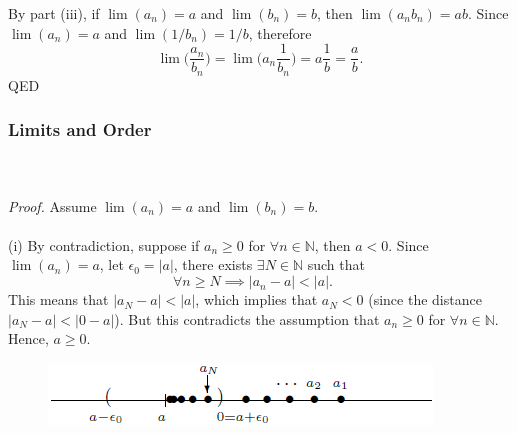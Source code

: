 \documentclass{article}
\begin{document}
                By part (iii), if $\lim(a_n)=a$ and $\lim (b_n)=b$, then $\lim (a_nb_n) = ab$. Since $\lim(a_n)=a$ and $\lim(1/b_n)=1/b$, therefore
                \begin{equation*}
                    \lim \bigg( \frac{a_n}{b_n} \bigg) = \lim \bigg( a_n \frac{1}{b_n} \bigg) = a \frac{1}{b} = \frac{a}{b}.
                \end{equation*}
                QED
            
            \subsubsection{Limits and Order}
                \\ \\
                \textit{Proof.} Assume $\lim(a_n)=a$ and $\lim(b_n)=b$.\\ \\
                (i) By contradiction, suppose if $a_n \geq 0$ for $\forall n \in \mathbb{N}$, then $a < 0$. Since $\lim(a_n)=a$, let $\epsilon_0=|a|$, there exists $\exists N \in \mathbb{N}$ such that
                \begin{equation*}
                    \forall n \geq N \implies |a_n - a| < |a|. \quad 
                \end{equation*}
                This means that $|a_N -a| < |a|$, which implies that $a_N < 0$ (since the distance $|a_N -a| < |0 - a|$). But this contradicts the assumption that $a_n \geq 0$ for $\forall n \in \mathbb{N}$. Hence, $a \geq 0$.
                \begin{figure}[ht!]
                    \centering
                    \includegraphics[width=0.6\linewidth]{figs/theorem2.3.4.png}
                    \caption{}
                \end{figure}\\ \\
\end{document}
